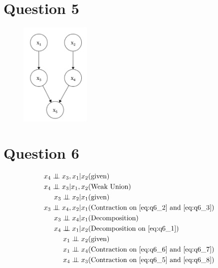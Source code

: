 \section{Question 5}
\begin{figure}[H]
    \centering
    \includegraphics[width=0.3\textwidth]{../images/BN_Q5.png}
\end{figure}
\section{Question 6}
\begin{align}
    x_4\independent x_3, x_1 | x_2 & \text{(given)}\label{eq:q6_1}\\
    x_4\independent x_3 | x_1, x_2 & \text{(Weak Union)}\label{eq:q6_2}\\
    x_3 \independent x_2 | x_1 & \text{(given)}\label{eq:q6_3}\\ 
    x_3 \independent x_4, x_2 | x_1 & \text{(Contraction on \ref{eq:q6_2} and \ref{eq:q6_3})}\label{eq:q6_4}\\
    x_3 \independent x_4 | x_1 & \text{(Decomposition)}\label{eq:q6_5}\\
    x_4 \independent x_1 | x_2 & \text{(Decomposition on \ref{eq:q6_1})}\label{eq:q6_6}\\
    x_1 \independent x_2 & \text{(given)}\label{eq:q6_7}\\
    x_1 \independent x_4 & \text{(Contraction on \ref{eq:q6_6} and \ref{eq:q6_7})}\label{eq:q6_8}\\
    x_4 \independent x_3 & \text{(Contraction on \ref{eq:q6_5} and \ref{eq:q6_8})}\label{eq:q6_9}
\end{align}
